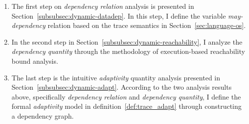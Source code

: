  \begin{enumerate}
 \item The first step on \emph{dependency relation} analysis is presented in Section~\ref{subsubsec:dynamic-datadep}.
 In this step, I define the variable \emph{may-dependency} relation based on the trace semantics in Section~\ref{sec:language-os}.
 \item In the second step in Section~\ref{subsubsec:dynamic-reachability}, I analyze the \emph{dependency quantity} through the methodology of execution-based reachability bound analysis.
 \item The last step is the intuitive \emph{adaptivity} quantity analysis presented in Section~\ref{subsubsec:dynamic-adapt}.
 According to the two analysis results above, specifically \emph{dependency relation} and \emph{dependency quantity},
 I define the formal \emph{adaptivity} model in definition~\ref{def:trace_adapt} through 
 constructing a dependency graph.
 \end{enumerate}


